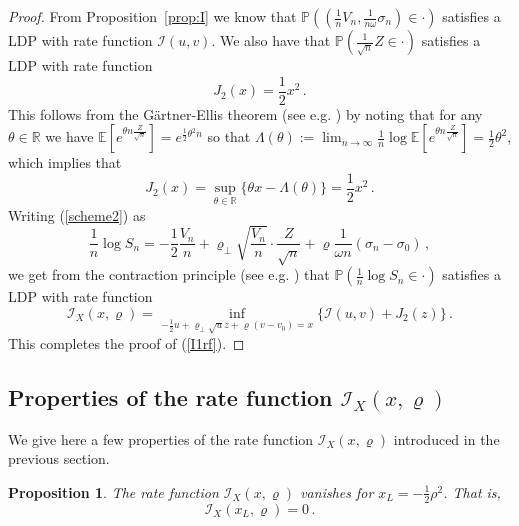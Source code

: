 \documentclass[11pt]{article}
\numberwithin{equation}{section}
\theoremstyle{plain}
\newtheorem{proposition}[theorem]{Proposition}
\begin{document}
\begin{proof}
From Proposition~\ref{prop:I} we know that
$\mathbb{P}((\frac{1}{n} V_n, \frac{1}{n\omega} \sigma_{n}) \in \cdot )$
satisfies a LDP with rate function $\mathcal{I}(u,v)$.
We also have that $\mathbb{P}(\frac{1}{\sqrt{n}} Z \in \cdot)$ 
satisfies a LDP with rate function 
\begin{equation}\label{J2sol}
J_2(x) = \frac12 x^2\,.
\end{equation}
This follows from the G\"artner-Ellis theorem (see e.g. \cite{Dembo}) by noting that
for any $\theta\in\mathbb{R}$ we have
$\mathbb{E}\left[e^{\theta n \frac{Z}{\sqrt{n}}}\right]= e^{\frac12\theta^2 n}$
so that $\Lambda(\theta) := \lim_{n\to \infty} \frac{1}{n} \log 
\mathbb{E}\left[e^{\theta n \frac{Z}{\sqrt{n}}}\right] =
\frac12\theta^2$,
which implies that
\begin{equation}
J_2(x) = \sup_{\theta\in\mathbb{R}}\{\theta x - \Lambda(\theta)\} = \frac12 x^2\,.
\end{equation}
Writing (\ref{scheme2}) as
\begin{equation}
\frac{1}{n} \log S_n = - \frac12 \frac{V_n}{n} + \varrho_\perp \sqrt{\frac{V_n}{n}} \cdot 
\frac{Z}{\sqrt{n}} + \varrho \frac{1}{\omega n} (\sigma_n - \sigma_0)\,,
\end{equation}
we get from the contraction principle (see e.g. \cite{Dembo}) that 
$\mathbb{P}(\frac{1}{n} \log S_n \in \cdot)$ satisfies a LDP 
with rate function 
\begin{equation}
\mathcal{I}_X(x,\varrho) = \inf_{-\frac12 u + \varrho_\perp \sqrt{u} z + \varrho (v-v_0)= x} \{ \mathcal{I}(u,v) + J_2(z) \}\,.
\end{equation}
This completes the proof of (\ref{I1rf}). 
\end{proof}

\subsection{Properties of the rate function $\mathcal{I}_X(x,\varrho)$}


We give here a few properties of the rate function $\mathcal{I}_X(x,\varrho)$
introduced in the previous section.

\begin{proposition}\label{prop:Iprop}
The rate function $\mathcal{I}_X(x,\varrho)$ 
vanishes for $x_L =-\frac12\rho^{2}$. That is,
\begin{equation}\label{zero}
\mathcal{I}_X\left( x_L, \varrho \right) = 0\,.
\end{equation}
\end{proposition}
\end{document}
